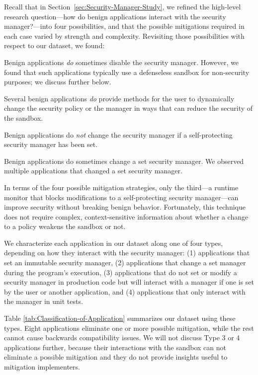 \documentclass{sig-alternate}
\begin{document}
Recall that in Section~\ref{sec:Security-Manager-Study}, we refined the
high-level research question---how do benign applications interact with the
security manager?---into four possibilities, and that the possible mitigations
required in each case varied by strength and complexity.  Revisiting those
possibilities with respect to our dataset, we found:
\begin{flushenum}\setlength{\parskip}{0pt}
  \setlength{\parsep}{0pt}
  \setlength{\itemsep}{0pt}
\item Benign applications \emph{do} sometimes disable the security manager.
  However, we found that such applications typically use a defenseless sandbox for
  non-security purposes; we discuss further below.

\item Several benign applications \emph{do} provide methods for the user to
  dynamically change the security policy or the manager in ways that can reduce
  the security of the sandbox.

\item Benign applications do \emph{not} change the
security manager if a self-protecting security manager has been set.  

\item Benign applications do sometimes change a set security manager.  We
  observed multiple applications that changed a set security manager.
\end{flushenum}

In terms of the four possible mitigation strategies,
only the third---a runtime monitor that blocks modifications to a self-protecting security manager---can
improve security without breaking benign behavior. 
Fortunately, this technique does not require complex, context-sensitive
information about whether a change to a policy weakens the sandbox or not. 

We characterize each application in our dataset along one of four types, depending on how they
interact with the security manager:
(1) applications that set an immutable
security manager, (2) applications that change a set manager during
the program's execution, (3) applications that do not set or modify a
security manager in production code but will interact with a manager if 
one is set by the user or another application, and (4) applications
that only interact with the manager in unit tests. 

Table \ref{tab:Classification-of-Application}
summarizes our dataset using these types. Eight applications eliminate one or more possible mitigation, while the rest cannot cause backwards compatibility issues. We will
not discuss Type 3 or 4 applications further, because their interactions with
the sandbox can not eliminate a possible mitigation and they do not provide insights useful to mitigation implementers.  
\end{document}
